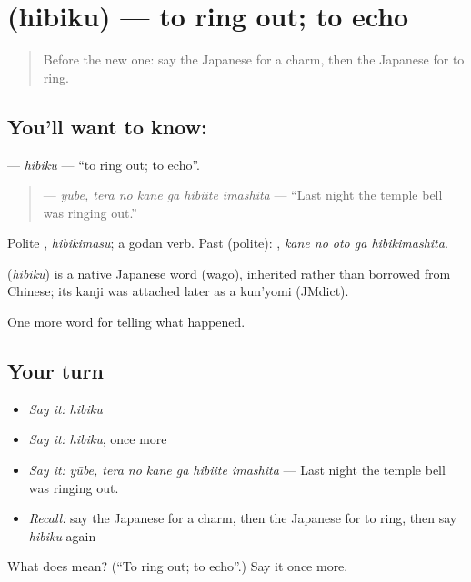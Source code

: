 \section[\texorpdfstring{\ja{ひびく} (hibiku)}{ひびく (hibiku)}]{ (hibiku) — to ring out; to echo}

\label{lesson:JA-C295-hibiku}



\begin{quote}
Before the new one: say the Japanese for a charm, then the Japanese for to ring.
\end{quote}

\subsection*{You'll want to know: }
\textbf{} — \emph{hibiku} — \textquotedblleft{}to ring out; to echo\textquotedblright{}.

\begin{quote}
\textbf{  } — \emph{yūbe, tera no kane ga hibiite imashita} — \textquotedblleft{}Last night the temple bell was ringing out.\textquotedblright{}
\end{quote}

Polite \textbf{}, \emph{hibikimasu}; a godan verb. Past (polite): \textbf{  }, \emph{kane no oto ga hibikimashita}.

\begin{cousinweb}
\textbf{} (\emph{hibiku}) is a native Japanese word (wago), inherited rather than borrowed from Chinese; its kanji was attached later as a kun'yomi (JMdict).
\end{cousinweb}

\begin{grammarlens}[title={What you've built}]
One more word for telling what happened.
\end{grammarlens}

\subsection*{Your turn}
\begin{itemize}
\raggedright
  \item \emph{Say it:} \emph{hibiku}
  \item \emph{Say it:} \emph{hibiku}, once more
  \item \emph{Say it:} \emph{yūbe, tera no kane ga hibiite imashita} — Last night the temple bell was ringing out.
  \item \emph{Recall:} say the Japanese for a charm, then the Japanese for to ring, then say \emph{hibiku} again
\end{itemize}

\begin{tcolorbox}[breakable,colback=teal!4,colframe=teal!35!black,title={Before you move on}]
What does  mean? (\textquotedblleft{}To ring out; to echo\textquotedblright{}.) Say it once more.
\end{tcolorbox}
